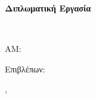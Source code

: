 \begin{titlepage}
  \centering
  {\large\scshape \University\par}
  \vspace{0.3cm}
  {\large \School\par}
  {\large \Department\par}
  \vspace{3cm}
  {\Large\bfseries Διπλωματική Εργασία\par}
  \vspace{1.2cm}
  {\LARGE\bfseries \ThesisTitleEl\par}
  \vspace{0.35cm}
  {\Large \ThesisSubtitleEl\par}
  \vspace{0.8cm}
  {\large\itshape{} \ThesisTitleEn\\ \ThesisSubtitleEn\par}
  \vspace{2.5cm}
  {\Large \AuthorEl\par}
  \vspace{0.2cm}
  {\normalsize ΑΜ: \StudentId\par}
  \vfill
  {\large Επιβλέπων: \SupervisorEl\par}
  \vspace{1.5cm}
  {\large \ThesisPlace, \ThesisDate\par}
\end{titlepage}
